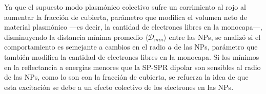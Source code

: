 Ya que el supuesto modo plasmónico colectivo sufre un corrimiento al rojo al aumentar la fracción de cubierta, parámetro que modifica el volumen neto de material plasmónico ---es decir, la cantidad de electrones libres en la monocapa---, disminuyendo la distancia mínima promedio $\langle\mathscr{D}_{min}\rangle$ entre las NPs, se analizó si el comportamiento es semejante a cambios en el radio $a$ de las NPs, parámetro que también modifica la cantidad de electrones libres en la monocapa. Si  los mínimos en la reflectancia  a energías menores que la SP-SPR dipolar son sensibles al radio de las NPs, como lo son con la fracción de cubierta, se refuerza la idea de que esta excitación se debe a un efecto colectivo de los electrones en las NPs.
 
\begin{figure}[h!]\centering
\hspace*{-.5em}
\end{figure}
